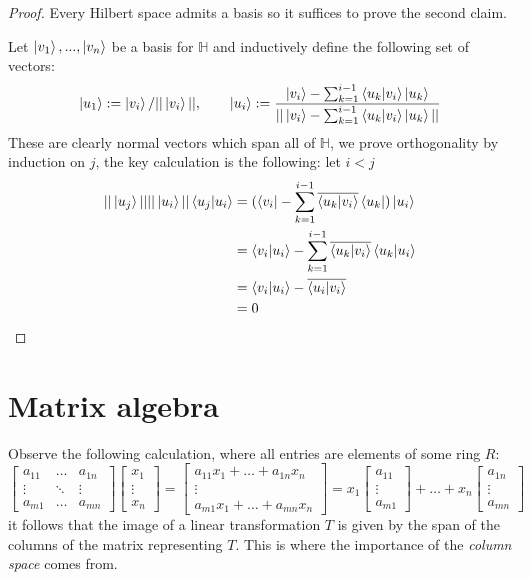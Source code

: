 \documentclass[12pt]{article}
\theoremstyle{plain}
\theoremstyle{definition}
\newcommand{\bb}[1]{\mathbb{#1}}
\begin{document}
\begin{proof}
Every Hilbert space admits a basis so it suffices to prove the second claim.

Let $\ket{v_1},...,\ket{v_n}$ be a basis for $\bb{H}$ and inductively define the following set of vectors:
\begin{equation}
\ket{u_1} := \ket{v_i}/||\ket{v_i}||,\qquad
\ket{u_i} := \frac{\ket{v_i} - \sum_{k = 1}^{i-1}\bra{u_k}\ket{v_i}\ket{u_k}}{||\ket{v_i} - \sum_{k = 1}^{i-1}\bra{u_k}\ket{v_i}\ket{u_k}||}
\end{equation}
These are clearly normal vectors which span all of $\bb{H}$, we prove orthogonality by induction on $j$, the key calculation is the following: let $i < j$
\begin{align*}
||\ket{u_j}|| ||\ket{u_i}||\bra{u_j}\ket{u_i} &= (\bra{v_i} - \sum_{k = 1}^{i-1}\overline{\bra{u_k}\ket{v_i}}\bra{u_k})\ket{u_i}\\
&= \bra{v_i}\ket{u_i} - \sum_{k = 1}^{i-1}\overline{\bra{u_k}\ket{v_i}}\bra{u_k}\ket{u_i}\\
&= \bra{v_i}\ket{u_i} - \overline{\bra{u_i}\ket{v_i}}\\
&= 0
\end{align*}
\end{proof}



\section{Matrix algebra}
Observe the following calculation, where all entries are elements of some ring $R$:
\begin{equation}
    \begin{bmatrix}
    a_{11} & \hdots & a_{1n}\\
    \vdots & \ddots & \vdots\\
    a_{m1} & \hdots & a_{mn}
    \end{bmatrix}
    \begin{bmatrix}
    x_1\\
    \vdots\\
    x_n
    \end{bmatrix}
    =
    \begin{bmatrix}
    a_{11}x_1 + \hdots + a_{1n}x_n\\
    \vdots\\
    a_{m1}x_1 + \hdots + a_{mn}x_n
    \end{bmatrix}
    =
    x_1
    \begin{bmatrix}
    a_{11}\\
    \vdots\\
    a_{m1}
    \end{bmatrix}
    + \hdots +
    x_n
    \begin{bmatrix}
    a_{1n}\\
    \vdots\\
    a_{mn}
    \end{bmatrix}
\end{equation}
it follows that the image of a linear transformation $T$ is given by the span of the columns of the matrix representing $T$. This is where the importance of the \emph{column space} comes from.
\end{document}
